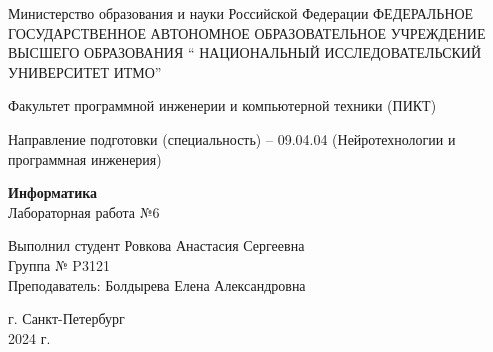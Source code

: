 \documentclass{article}
\begin{document}
\begin{center}
Министерство образования и науки Российской Федерации
ФЕДЕРАЛЬНОЕ ГОСУДАРСТВЕННОЕ АВТОНОМНОЕ ОБРАЗОВАТЕЛЬНОЕ УЧРЕЖДЕНИЕ ВЫСШЕГО ОБРАЗОВАНИЯ 
“ НАЦИОНАЛЬНЫЙ ИССЛЕДОВАТЕЛЬСКИЙ 
УНИВЕРСИТЕТ ИТМО”
\end{center}
Факультет программной инженерии и компьютерной техники (ПИКТ)

Направление подготовки (специальность) – 09.04.04  (Нейротехнологии и программная инженерия) \\
[2cm]

\begin{center}
\Large \textbf{Информатика} \\
[1cm] 

Лабораторная работа №6 \\
[3cm]
\end{center}


\begin{flushright}
    Выполнил студент 
Ровкова Анастасия Сергеевна \\
Группа № P3121 \\
Преподаватель: Болдырева Елена Александровна \\
\end{flushright}
\vspace*{\fill}
\begin{center}
г. Санкт-Петербург \\
2024 г.
\end{center}
\end{document}
